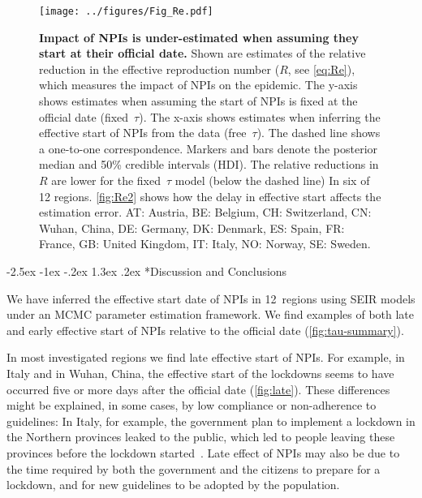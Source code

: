 \documentclass[12pt]{extarticle}
\makeatletter
\renewcommand\section{\@startsection {section}{1}{\z@}%
     {-2.5ex \@plus -1ex \@minus -.2ex}%
     {1.3ex \@plus.2ex}%
    {\Large\bfseries}}
\makeatother
\begin{document}
\begin{figure}[h]
    \centering
	\texttt{[image: ../figures/Fig\_Re.pdf]}
    \caption{
    \textbf{Impact of NPIs is under-estimated when assuming they start at their official date.}
    Shown are estimates of the relative reduction in the effective reproduction number ($R$, see \autoref{eq:Re}), which measures the impact of NPIs on the epidemic.
     The y-axis shows estimates when assuming the start of NPIs is fixed at the official date (fixed~$\tau$). The x-axis shows estimates when inferring the effective start of NPIs from the data (free~$\tau$). The dashed line shows a one-to-one correspondence.
     Markers and bars denote the posterior median and 50\% credible intervals (HDI).
    The relative reductions in $R$ are lower for the fixed~$\tau$ model (below the dashed line) In six of 12 regions.
    \autoref{fig:Re2} shows how the delay in effective start affects the estimation error. 
    AT: Austria, BE: Belgium, CH: Switzerland, CN: Wuhan, China, DE: Germany, DK: Denmark, ES: Spain, FR: France, GB: United Kingdom, IT: Italy, NO: Norway, SE: Sweden.
    } 
    \label{fig:Re}
\end{figure}



\section*{Discussion and Conclusions}

We have inferred the effective start date of NPIs in 12~regions using SEIR models under an MCMC parameter estimation framework.
We find examples of both late and early effective start of NPIs relative to the official date (\autoref{fig:tau-summary}).

In most investigated regions we find late effective start of NPIs.
For example, in Italy and in Wuhan, China, the effective start of the lockdowns seems to have occurred five or more days after the official date (\autoref{fig:late}).
These differences might be explained, in some cases, by low compliance or non-adherence to guidelines: In Italy, for example, the government plan to implement a lockdown in the Northern provinces leaked to the public, which led to people leaving these provinces before the lockdown started~\citep{Gatto2020}.
Late effect of NPIs may also be due to the time required by both the government and the citizens to prepare for a lockdown, and for new guidelines to be adopted by the population.
 
\end{document}
